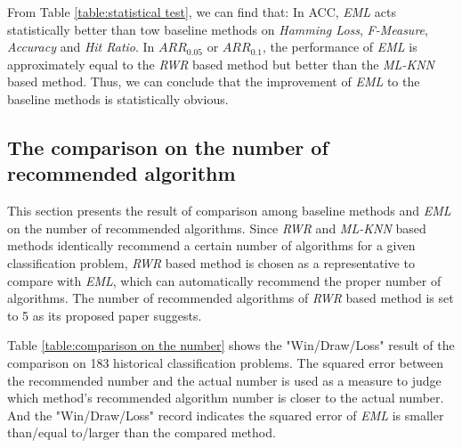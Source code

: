 \documentclass[review,3p,twocolumn,times]{elsarticle}
\begin{document}
From Table \ref{table:statistical test}, we can find that: In ACC, \emph{EML} acts statistically better than tow baseline methods on \emph{Hamming Loss}, \emph{F-Measure}, \emph{Accuracy} and \emph{Hit Ratio}. In $ARR_{0.05}$ or $ARR_{0.1}$, the performance of \emph{EML} is approximately equal to the \emph{RWR} based method but better than the \emph{ML-KNN} based method. Thus, we can conclude that the improvement of \emph{EML} to the baseline methods is statistically obvious.

\subsection{The comparison on the number of recommended algorithm}
\label{comparison on the number}

This section presents the result of comparison among baseline methods and \emph{EML} on the number of recommended algorithms. Since \emph{RWR} and \emph{ML-KNN} based methods identically recommend a certain number of algorithms for a given classification problem, \emph{RWR} based method is chosen as a representative to compare with \emph{EML}, which can automatically recommend the proper number of algorithms. The number of recommended algorithms of \emph{RWR} based method is set to 5 as its proposed paper suggests.

\begin{table}[!h]
	\renewcommand\arraystretch{1.15}
	\centering
	\caption{The comparison on the recommended algorithm number between \emph{RWR} based and \emph{EML} methods}
	\label{table:comparison on the number}
	
\end{table} 

Table \ref{table:comparison on the number} shows the "Win/Draw/Loss" result of the comparison on 183 historical classification problems. The squared error between the recommended number and the actual number is used as a measure to judge which method's recommended algorithm number is closer to the actual number. And the "Win/Draw/Loss" record indicates the squared error of \emph{EML} is smaller than/equal to/larger than the compared method. 
\end{document}
